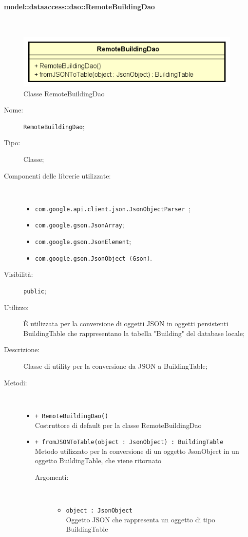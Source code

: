 \documentclass[../DefinizioneDiProdotto.tex]{subfiles}
\begin{document}
\paragraph{model::dataaccess::dao::RemoteBuildingDao}
\
\begin{figure}[H]
	\centering
	\includegraphics[width=\maxwidth]{img/RemoteBuildingDao.png}
	\caption{Classe RemoteBuildingDao}\label{fig:model::dataaccess::dao::RemoteBuildingDao} 
\end{figure}
\begin{description}
	\item[Nome:] \texttt{RemoteBuildingDao};
	\item[Tipo:] Classe;
	\item[Componenti delle librerie utilizzate:] \
	\begin{itemize}
		\item \texttt{com.google.api.client.json.JsonObjectParser
		};
		
		\item \texttt{com.google.gson.JsonArray};
		
		\item \texttt{com.google.gson.JsonElement};
		
		\item \texttt{com.google.gson.JsonObject (Gson)}.
		
	\end{itemize}
	\item[Visibilità:] \texttt{public};
	\item[Utilizzo:] È utilizzata per la conversione di oggetti JSON in oggetti persistenti BuildingTable che rappresentano la tabella "Building" del database locale;
	\item[Descrizione:] Classe di utility per la conversione da JSON a BuildingTable;
	\item[Metodi:] \
	\begin{itemize}
		\item \texttt{+ RemoteBuildingDao()}\\
		Costruttore di default per la classe RemoteBuildingDao
		\item \texttt{+ fromJSONToTable(object : JsonObject) : BuildingTable}\\
		Metodo utilizzato per la conversione di un oggetto JsonObject in un oggetto BuildingTable, che viene ritornato
		\begin{description}
			\item[Argomenti:] \
			\begin{itemize}
				\item \texttt{object : JsonObject}\\
				Oggetto JSON che rappresenta un oggetto di tipo BuildingTable\end{itemize}
		\end{description}
	\end{itemize}
\end{description}
\end{document}
